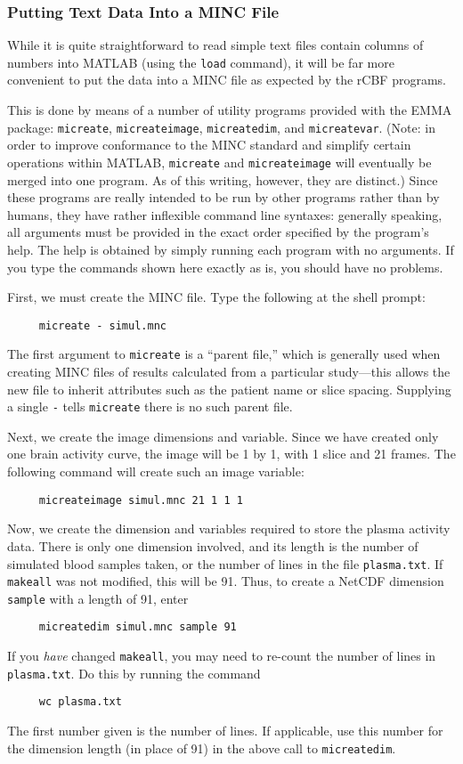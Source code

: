 \subsubsection{Putting Text Data Into a MINC File}

While it is quite straightforward to read simple text files contain
columns of numbers into MATLAB (using the \verb|load| command), it
will be far more convenient to put the data into a MINC file as
expected by the rCBF programs.

This is done by means of a number of utility programs provided with
the EMMA package: \verb|micreate|, \verb|micreateimage|,
\verb|micreatedim|, and \verb|micreatevar|.  (Note: in order to
improve conformance to the MINC standard and simplify certain
operations within MATLAB, \verb|micreate| and \verb|micreateimage|
will eventually be merged into one program.  As of this writing,
however, they are distinct.)  Since these programs are really intended
to be run by other programs rather than by humans, they have rather
inflexible command line syntaxes: generally speaking, all arguments
must be provided in the exact order specified by the program's help.
The help is obtained by simply running each program with no arguments.
If you type the commands shown here exactly as is, you should have no
problems.

First, we must create the MINC file.  Type the following at the shell
prompt:
\begin{verbatim}
     micreate - simul.mnc
\end{verbatim}
The first argument to \verb|micreate| is a ``parent file,'' which is
generally used when creating MINC files of results calculated from a
particular study---this allows the new file to inherit attributes such
as the patient name or slice spacing.  Supplying a single \verb|-|
tells \verb|micreate| there is no such parent file.

Next, we create the image dimensions and variable.  Since we have
created only one brain activity curve, the image will be 1 by 1, with
1 slice and 21 frames.  The following command will create such an
image variable:
\begin{verbatim}
     micreateimage simul.mnc 21 1 1 1
\end{verbatim}

Now, we create the dimension and variables required to store the
plasma activity data.  There is only one dimension involved, and its
length is the number of simulated blood samples taken, or the number
of lines in the file \verb|plasma.txt|.  If \verb|makeall| was not
modified, this will be 91.  Thus, to create a NetCDF dimension
\verb|sample| with a length of 91, enter
\begin{verbatim}
     micreatedim simul.mnc sample 91
\end{verbatim}
If you {\em have} changed \verb|makeall|, you may need to re-count the
number of lines in \verb|plasma.txt|.  Do this by running the command
\begin{verbatim}
     wc plasma.txt
\end{verbatim}
The first number given is the number of lines.  If applicable, use
this number for the dimension length (in place of 91) in the above
call to \verb|micreatedim|.

